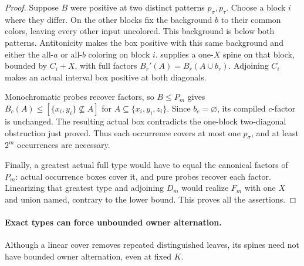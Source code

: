 \begin{proof}
Suppose $B$ were positive at two distinct patterns $p_\sigma,p_\tau$.
Choose a block $i$ where they differ. On the other blocks fix the
background $b$ to their common colors, leaving every other input
uncolored. This background is below both patterns. Antitonicity makes
the box positive with this same background and either the all-$a$
or all-$b$ coloring on block $i$.
 supplies a one-$X$ spine
on that block, bounded by $C_i+X$, with full
factors $B_r'(A)=B_r(A\cup b_r)$.
Adjoining $C_i$ makes an actual interval box positive at both diagonals.

Monochromatic probes recover factors, so $B\leq P_m$ gives
$B_c(A)\leq[\{x_i,y_i\}\nsubseteq A]$ for $A\subseteq\{x_i,y_i,z_i\}$.
Since $b_c=\varnothing$, its compiled $c$-factor is unchanged.
The resulting actual box contradicts the one-block two-diagonal
obstruction just proved. Thus each occurrence covers at most one
$p_\sigma$, and at least $2^m$ occurrences are necessary.

Finally, a greatest actual full type would have to equal the canonical
factors of $P_m$: actual occurrence boxes cover it, and pure probes
recover each factor. Linearizing that greatest type and adjoining
$D_m$ would realize $F_m$ with one $X$ and union named, contrary to
the lower bound. This proves all the assertions.
\end{proof}

\paragraph{Exact types can force unbounded owner alternation.}
Although a linear cover removes repeated distinguished leaves, its
spines need not have bounded owner alternation, even at fixed $K$.

